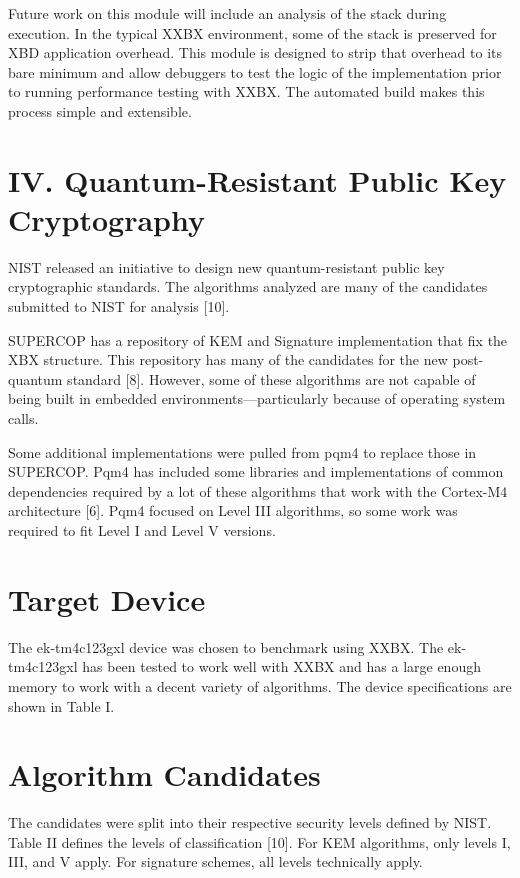 \documentclass[10pt]{article}
\begin{document}
Future work on this module will include an analysis of the stack during execution. 
In the typical XXBX environment, some of the stack is preserved for XBD application overhead. 
This module is designed to strip that overhead to its bare minimum and allow debuggers to 
test the logic of the implementation prior to running performance testing with XXBX. 
The automated build makes this process simple and extensible.


\section{IV. Quantum-Resistant Public Key Cryptography}

NIST released an initiative to design new quantum-resistant public key cryptographic 
standards. The algorithms analyzed are many of the candidates submitted to NIST for 
analysis [10].

SUPERCOP has a repository of KEM and Signature implementation that fix the XBX structure. 
This repository has many of the candidates for the new post-quantum standard [8]. 
However, some of these algorithms are not capable of being built in embedded 
environments—particularly because of operating system calls.

Some additional implementations were pulled from pqm4 to replace those in SUPERCOP. 
Pqm4 has included some libraries and implementations of common dependencies required by 
a lot of these algorithms that work with the Cortex-M4 architecture [6]. Pqm4 focused on 
Level III algorithms, so some work was required to fit Level I and Level V versions. 

\section{Target Device}

The ek-tm4c123gxl device was chosen to benchmark using XXBX. 
The ek-tm4c123gxl has been tested to work well with XXBX and has a large enough memory 
to work with a decent variety of algorithms. The device specifications are shown in Table I.

\section{Algorithm Candidates}

The candidates were split into their respective security levels defined by NIST. 
Table II defines the levels of classification [10].
For KEM algorithms, only levels I, III, and V apply. For signature schemes, all levels 
technically apply.
\end{document}
